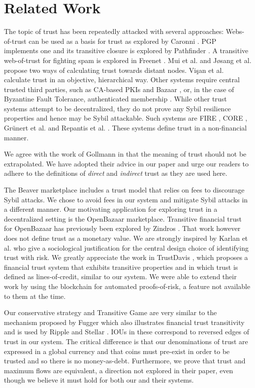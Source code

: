 \section{Related Work}
  The topic of trust has been repeatedly attacked with several approaches: Webs-of-trust can be used as a basis for trust as
  explored by Caronni \cite{wot}. PGP \cite{pgp} implements one and its transitive closure is explored by Pathfinder
  \cite{pathfinder}. A transitive web-of-trust for fighting spam is explored in Freenet \cite{freenet}. Mui et al. \cite{mui}
  and J\o{}sang et al. \cite{beta} propose two ways of calculating trust towards distant nodes. Vi\c{s}an et al. \cite{vpc}
  calculate trust in an objective, hierarchical way. Other systems require central trusted third parties, such as CA-based
  PKIs \cite{pki} and Bazaar \cite{bazaar}, or, in the case of Byzantine Fault Tolerance, authenticated membership
  \cite{byzantine}. While other trust systems attempt to be decentralized, they do not prove any Sybil resilience properties
  and hence may be Sybil attackable. Such systems are FIRE \cite{fire}, CORE \cite{core}, Gr\"unert et al. \cite{ghkkw} and
  Repantis et al. \cite{rk}. These systems define trust in a non-financial manner.

  We agree with the work of Gollmann \cite{badtrust} in that the meaning of trust should not be extrapolated. We have adopted
  their advice in our paper and urge our readers to adhere to the definitions of \textit{direct} and \textit{indirect} trust
  as they are used here.

  The Beaver marketplace \cite{beaver} includes a trust model that relies on fees to discourage Sybil attacks. We chose to
  avoid fees in our system and mitigate Sybil attacks in a different manner. Our motivating application for exploring trust
  in a decentralized setting is the OpenBazaar marketplace. Transitive financial trust for OpenBazaar has previously been
  explored by Zindros \cite{dionyziz}. That work however does not define trust as a monetary value. We are strongly inspired
  by Karlan et al. \cite{kmrs} who give a sociological justification for the central design choice of identifying trust with
  risk. We greatly appreciate the work in TrustDavis \cite{davis}, which proposes a financial trust system that exhibits
  transitive properties and in which trust is defined as lines-of-credit, similar to our system. We were able to extend their
  work by using the blockchain for automated proofs-of-risk, a feature not available to them at the time.

  Our conservative strategy and Transitive Game are very similar to the mechanism proposed by Fugger \cite{iou} which also
  illustrates financial trust transitivity and is used by Ripple \cite{ripple} and Stellar \cite{stellar}. IOUs in these
  correspond to reversed edges of trust in our system. The critical difference is that our denominations of trust are
  expressed in a global currency and that coins must pre-exist in order to be trusted and so there is no money-as-debt.
  Furthermore, we prove that trust and maximum flows are equivalent, a direction not explored in their paper, even though we
  believe it must hold for both our and their systems.
